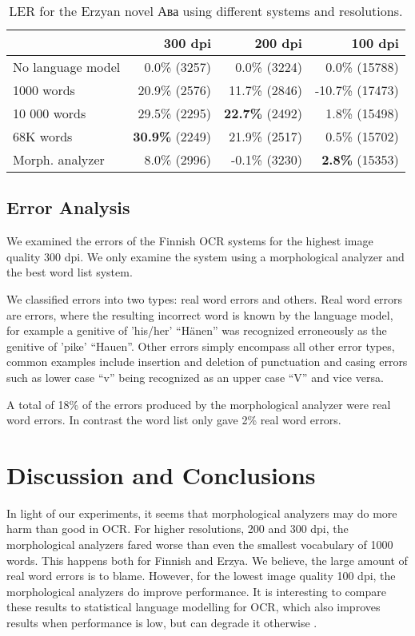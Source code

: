 \documentclass[b5paper]{article}
\begin{document}
\begin{table}[!htb]
\begin{center}
\begin{tabular}{lrrr}
\hline 
                  & 300 dpi & 200 dpi & 100 dpi \\
\hline 
No language model &  0.0\% (3257)  &  0.0\% (3224)  &  0.0\% (15788)  \\
1000 words        &  20.9\% (2576)  &  11.7\% (2846)  & -10.7\%  (17473) \\
10 000 words      &  29.5\% (2295)  &   {\bf 22.7\%} (2492)  & 1.8\% (15498)  \\
68K words         &  {\bf 30.9\%} (2249)  &  21.9\% (2517)  & 0.5\% (15702)\\
Morph. analyzer   &  8.0\% (2996)  &  -0.1\% (3230)  & {\bf 2.8\%} (15353)  \\
\hline 
\end{tabular}
\caption{LER for the Erzyan novel Ава using different systems and resolutions.}\label{myv-novel-res}
\end{center}
\end{table}

\subsection{Error Analysis}

We examined the errors of the Finnish OCR systems for the highest
image quality 300 dpi. We only examine the system using a morphological
analyzer and the best word list system.

We classified errors into two types: real word errors and others. Real
word errors are errors, where the resulting incorrect word is known by
the language model, for example a genitive of
'his/her' ``Hänen'' was recognized erroneously as the genitive
of 'pike' ``Hauen''. Other errors simply encompass all other error
types, common examples include insertion and deletion of punctuation
and casing errors such as lower case ``v'' being recognized as an
upper case ``V'' and vice versa.

A total of 18\% of the errors produced by the morphological analyzer
were real word errors. In contrast the word list only gave 2\% real
word errors.

\section{Discussion and Conclusions}
\label{disc}

In light of our experiments, it seems that morphological analyzers may
do more harm than good in OCR. For higher resolutions, 200 and 300 dpi,
the morphological analyzers fared worse than even the smallest
vocabulary of 1000 words. This happens both for Finnish and Erzya. We
believe, the large amount of real word errors is to blame. However,
for the lowest image quality 100 dpi, the morphological analyzers do
improve performance. It is interesting to compare these results to
statistical language modelling for OCR, which also improves results
when performance is low, but can degrade it otherwise \cite{smith11}.
\end{document}
